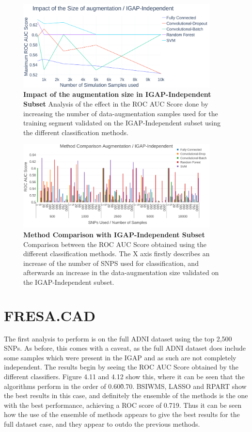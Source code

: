 \begin{figure}[!ht]
\centerline{\includegraphics[width=4in]{images/results/ImpactDataAug2.png}}
\caption{{\bf Impact of the augmentation size in IGAP-Independent Subset}
Analysis of the effect in the ROC AUC Score done by increasing the number of data-augmentation samples used for the training segment validated on the IGAP-Independent subset using the different classification methods.}
\label{fig12}
\end{figure}

\begin{figure}[!ht]
\centerline{\includegraphics[width=4in]{images/results/DataAugComplete2.png}}
\caption{{\bf Method Comparison with IGAP-Independent Subset}
Comparison between the ROC AUC Score obtained using the different classification methods. The X axis firstly describes an increase of the number of SNPS used for classification, and afterwards an increase in the data-augmentation size validated on the IGAP-Independent subset.}
\label{fig13}
\end{figure}
\newpage
\section{FRESA.CAD}


The first analysis to perform is on the full ADNI dataset using the top 2,500 SNPs. As before, this comes with a caveat, as the full ADNI dataset does include some samples which were present in the IGAP and as such are not completely independent. The results begin by seeing the ROC AUC Score obtained by the different classifiers. Figure 4.11 and 4.12 show this, where it can be seen that the algorithms perform in the order of 0.60\~0.70. BSIWMS, LASSO and RPART show the best results in this case, and definitely the ensemble of the methods is the one with the best performance, achieving a ROC score of 0.719. Thus it can be seen how the use of the ensemble of methods appears to give the best results for the full dataset case, and they appear to outdo the previous methods. 


